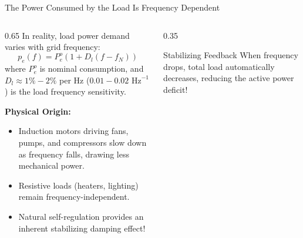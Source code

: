 \begin{frame}{The Power Consumed by the Load Is Frequency Dependent}
\begin{columns}[T]
\begin{column}{0.65\textwidth}
    \footnotesize
    In reality, load power demand varies with grid frequency:
    \begin{equation*}
        p_e(f) = P_e^o \left( 1 + D_l (f - f_N) \right)
    \end{equation*}
    where $P_e^o$ is nominal consumption, and $D_l \approx 1\% - 2\%$ per Hz ($0.01 - 0.02\text{ Hz}^{-1}$) is the load frequency sensitivity.
    \vspace{0.1cm}
    
    \textbf{Physical Origin:}
    \begin{itemize}\setlength{\itemsep}{1pt}
        \item Induction motors driving fans, pumps, and compressors slow down as frequency falls, drawing less mechanical power.
        \item Resistive loads (heaters, lighting) remain frequency-independent.
        \item Natural self-regulation provides an inherent stabilizing damping effect!
    \end{itemize}
\end{column}
\begin{column}{0.35\textwidth}
    \begin{block}{Stabilizing Feedback}
    \scriptsize
    When frequency drops, total load automatically decreases, reducing the active power deficit!
    \end{block}
\end{column}
\end{columns}
\end{frame}

